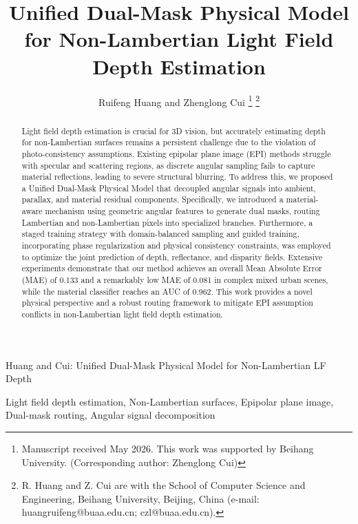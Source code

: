 \documentclass[lettersize,journal]{IEEEtran}
\begin{document}
\title{Unified Dual-Mask Physical Model for Non-Lambertian Light Field Depth Estimation}

\author{Ruifeng Huang and Zhenglong Cui
\thanks{Manuscript received May 2026. This work was supported by Beihang University. (Corresponding author: Zhenglong Cui)}
\thanks{R. Huang and Z. Cui are with the School of Computer Science and Engineering, Beihang University, Beijing, China (e-mail: huangruifeng@buaa.edu.cn; czl@buaa.edu.cn).}}

%
{Huang and Cui: Unified Dual-Mask Physical Model for Non-Lambertian LF Depth}

\maketitle

\begin{abstract}
Light field depth estimation is crucial for 3D vision, but accurately estimating depth for non-Lambertian surfaces remains a persistent challenge due to the violation of photo-consistency assumptions. Existing epipolar plane image (EPI) methods struggle with specular and scattering regions, as discrete angular sampling fails to capture material reflections, leading to severe structural blurring. To address this, we proposed a Unified Dual-Mask Physical Model that decoupled angular signals into ambient, parallax, and material residual components. Specifically, we introduced a material-aware mechanism using geometric angular features to generate dual masks, routing Lambertian and non-Lambertian pixels into specialized branches. Furthermore, a staged training strategy with domain-balanced sampling and guided training, incorporating phase regularization and physical consistency constraints, was employed to optimize the joint prediction of depth, reflectance, and disparity fields. Extensive experiments demonstrate that our method achieves an overall Mean Absolute Error (MAE) of 0.133 and a remarkably low MAE of 0.081 in complex mixed urban scenes, while the material classifier reaches an AUC of 0.962. This work provides a novel physical perspective and a robust routing framework to mitigate EPI assumption conflicts in non-Lambertian light field depth estimation.
\end{abstract}

\begin{IEEEkeywords}
Light field depth estimation, Non-Lambertian surfaces, Epipolar plane image, Dual-mask routing, Angular signal decomposition
\end{IEEEkeywords}
\end{document}
